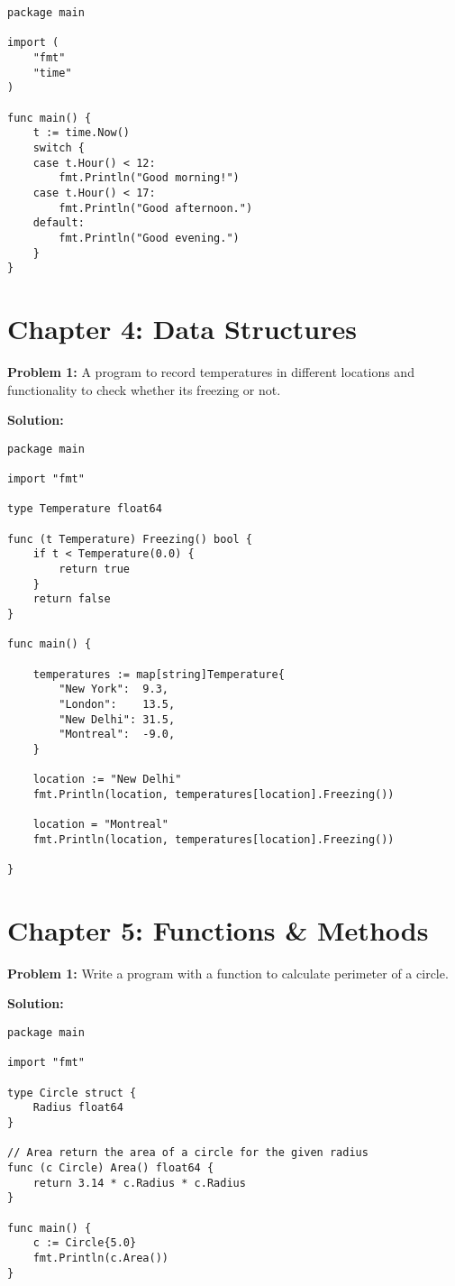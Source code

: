 \begin{lstlisting}[numbers=none]
package main

import (
    "fmt"
    "time"
)

func main() {
    t := time.Now()
    switch {
    case t.Hour() < 12:
        fmt.Println("Good morning!")
    case t.Hour() < 17:
        fmt.Println("Good afternoon.")
    default:
        fmt.Println("Good evening.")
    }
}
\end{lstlisting}

\section*{Chapter 4: Data Structures}

\textbf{Problem 1:} A program to record temperatures
in different locations and functionality to check whether its freezing
or not.

\textbf{Solution:}

\begin{lstlisting}[numbers=none]
package main

import "fmt"

type Temperature float64

func (t Temperature) Freezing() bool {
    if t < Temperature(0.0) {
        return true
    }
    return false
}

func main() {

    temperatures := map[string]Temperature{
        "New York":  9.3,
        "London":    13.5,
        "New Delhi": 31.5,
        "Montreal":  -9.0,
    }

    location := "New Delhi"
    fmt.Println(location, temperatures[location].Freezing())

    location = "Montreal"
    fmt.Println(location, temperatures[location].Freezing())

}
\end{lstlisting}

\section*{Chapter 5: Functions \& Methods}

\textbf{Problem 1:} Write a program with a function to calculate perimeter of a circle.

\textbf{Solution:}

\begin{lstlisting}[numbers=none]
package main

import "fmt"

type Circle struct {
    Radius float64
}

// Area return the area of a circle for the given radius
func (c Circle) Area() float64 {
    return 3.14 * c.Radius * c.Radius
}

func main() {
    c := Circle{5.0}
    fmt.Println(c.Area())
}
\end{lstlisting}

